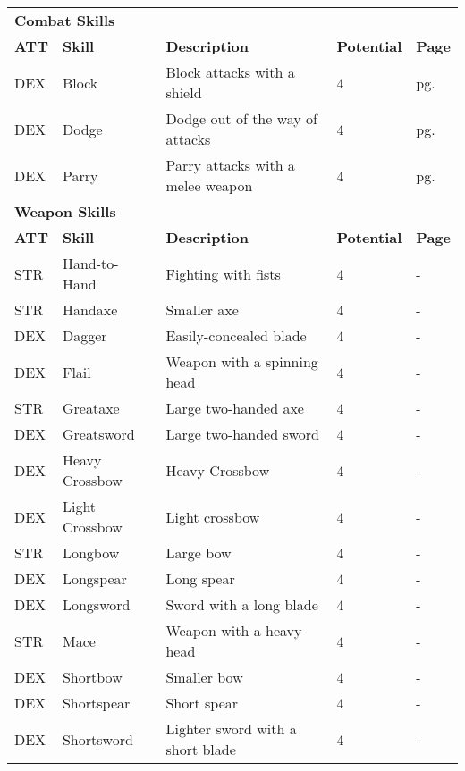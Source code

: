\begin{multicols*}{2}
\begin{table*}[ht]
\begin{tabularx}{\textwidth}{l l X l l}
            \multicolumn{5}{l}{\bfseries{Combat Skills}} \\
            \bfseries{ATT} & \bfseries{Skill} & \bfseries{Description} & \bfseries{Potential} & \bfseries{Page} \\
            DEX & Block & Block attacks with a shield & 4 & pg. \pageref{skill:block} \\
            DEX & Dodge & Dodge out of the way of attacks & 4 & pg. \pageref{skill:dodge} \\
            DEX & Parry & Parry attacks with a melee weapon & 4 & pg. \pageref{skill:parry} \\
            \multicolumn{5}{l}{\bfseries{Weapon Skills}} \\
            \bfseries{ATT} & \bfseries{Skill} & \bfseries{Description} & \bfseries{Potential} & \bfseries{Page} \\
            STR & Hand-to-Hand & Fighting with fists & 4 & - \\
            STR & Handaxe & Smaller axe & 4 & - \\
            DEX & Dagger & Easily-concealed blade & 4 & - \\
            DEX & Flail & Weapon with a spinning head & 4 & - \\ %
            STR & Greataxe & Large two-handed axe & 4 & - \\
            DEX & Greatsword & Large two-handed sword & 4 & - \\ %
            DEX & Heavy Crossbow & Heavy Crossbow & 4 & - \\
            DEX & Light Crossbow & Light crossbow & 4 & - \\
            STR & Longbow & Large bow & 4 & - \\ %
            DEX & Longspear & Long spear & 4 & - \\
            DEX & Longsword & Sword with a long blade & 4 & - \\
            STR & Mace & Weapon with a heavy head & 4 & - \\ %
            DEX & Shortbow & Smaller bow & 4 & - \\ %
            DEX & Shortspear & Short spear & 4 & - \\
            DEX & Shortsword & Lighter sword with a short blade & 4 & - \\

\end{tabularx}
\end{table*}
\end{multicols*}
